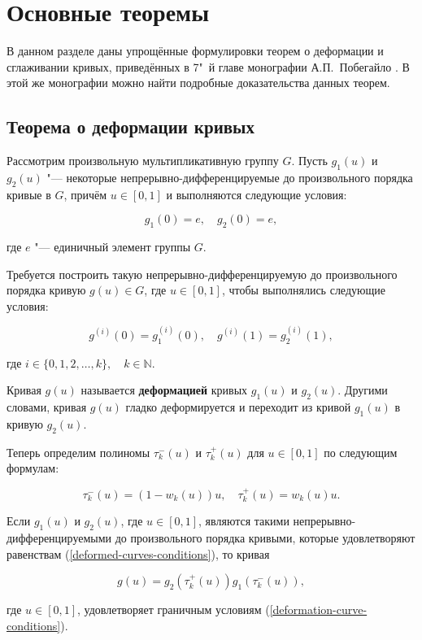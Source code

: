 \section{Основные теоремы}

В данном разделе даны упрощённые формулировки теорем о деформации и сглаживании кривых, приведённых в 7"~й главе
монографии А.П.~Побегайло \cite{pobegaylo}. В этой же монографии можно найти подробные доказательства данных теорем.

\subsection*{Теорема о деформации кривых}

Рассмотрим произвольную мультипликативную группу $G$. Пусть $g_1(u)$ и $g_2(u)$ "--- некоторые
непрерывно-дифференцируемые до произвольного порядка кривые в $G$, причём $u \in [0,1]$ и выполняются следующие условия:

\begin{equation}
g_1(0)=e, \quad g_2(0)=e,
\label{deformed-curves-conditions}
\end{equation}

\noindent где $e$ "--- единичный элемент группы $G$.

Требуется построить такую непрерывно-дифференцируемую до произвольного порядка кривую $g(u)\in G$, где $u \in [0,1]$,
чтобы выполнялись следующие условия:

\begin{equation}
g^{(i)}(0)=g_1^{(i)}(0), \quad g^{(i)}(1)=g_2^{(i)}(1),
\label{deformation-curve-conditions}
\end{equation}

\noindent где $i \in \{0,1,2,\dots,k\},\quad k\in\mathbb{N}$.

\begin{definition}
Кривая $g(u)$ называется \textbf{деформацией} кривых $g_1(u)$ и $g_2(u)$. Другими словами, кривая $g(u)$ гладко
деформируется и переходит из кривой $g_1(u)$ в кривую $g_2(u)$.
\end{definition}

Теперь определим полиномы $\tau_k^-(u)$ и $\tau_k^+(u)$ для $u \in [0,1]$ по следующим формулам:

$$
\tau_k^-(u)=(1-w_k(u))u, \quad \tau_k^+(u)=w_k(u)u.
$$

\begin{theorem}
Если $g_1(u)$ и $g_2(u)$, где $u \in [0,1]$, являются такими непрерывно-дифференцируемыми до произвольного порядка
кривыми, которые удовлетворяют равенствам (\ref{deformed-curves-conditions}), то кривая

$$
g(u)=g_2(\tau_k^+(u))g_1(\tau_k^-(u)),
$$

\noindent где $u \in [0,1]$, удовлетворяет граничным условиям (\ref{deformation-curve-conditions}).
\end{theorem}

